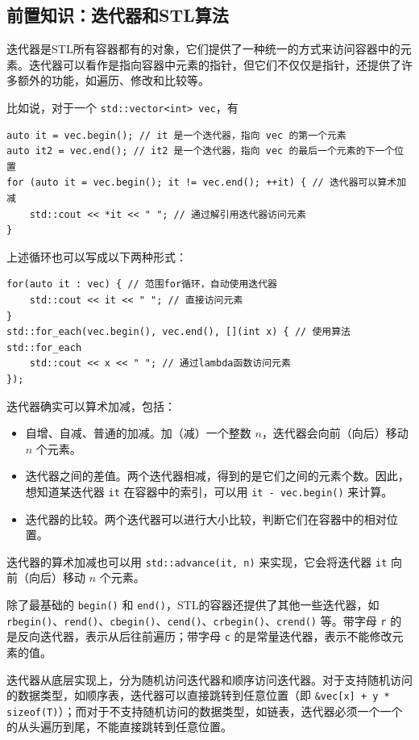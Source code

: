 \subsection{前置知识：迭代器和STL算法}

迭代器是STL所有容器都有的对象，它们提供了一种统一的方式来访问容器中的元素。迭代器可以看作是指向容器中元素的指针，但它们不仅仅是指针，还提供了许多额外的功能，如遍历、修改和比较等。

比如说，对于一个 \verb|std::vector<int> vec|，有
\begin{verbatim}
auto it = vec.begin(); // it 是一个迭代器，指向 vec 的第一个元素
auto it2 = vec.end(); // it2 是一个迭代器，指向 vec 的最后一个元素的下一个位置
for (auto it = vec.begin(); it != vec.end(); ++it) { // 迭代器可以算术加减
    std::cout << *it << " "; // 通过解引用迭代器访问元素
}
\end{verbatim}

上述循环也可以写成以下两种形式：
\begin{verbatim}
for(auto it : vec) { // 范围for循环，自动使用迭代器
    std::cout << it << " "; // 直接访问元素
}
std::for_each(vec.begin(), vec.end(), [](int x) { // 使用算法 std::for_each
    std::cout << x << " "; // 通过lambda函数访问元素
});
\end{verbatim}

迭代器确实可以算术加减，包括：
\begin{itemize}
    \item 自增、自减、普通的加减。加（减）一个整数 $n$，迭代器会向前（向后）移动 $n$ 个元素。
    \item 迭代器之间的差值。两个迭代器相减，得到的是它们之间的元素个数。因此，想知道某迭代器 \verb|it| 在容器中的索引，可以用 \verb|it - vec.begin()| 来计算。
    \item 迭代器的比较。两个迭代器可以进行大小比较，判断它们在容器中的相对位置。
\end{itemize}
迭代器的算术加减也可以用 \verb|std::advance(it, n)| 来实现，它会将迭代器 \verb|it| 向前（向后）移动 $n$ 个元素。

除了最基础的 \verb|begin()| 和 \verb|end()|，STL的容器还提供了其他一些迭代器，如 \verb|rbegin()|、\verb|rend()|、\verb|cbegin()|、\verb|cend()|、\verb|crbegin()|、\verb|crend()| 等。带字母 \verb|r| 的是反向迭代器，表示从后往前遍历；带字母 \verb|c| 的是常量迭代器，表示不能修改元素的值。

迭代器从底层实现上，分为随机访问迭代器和顺序访问迭代器。对于支持随机访问的数据类型，如顺序表，迭代器可以直接跳转到任意位置（即 \verb|&vec[x] + y * sizeof(T)|）；而对于不支持随机访问的数据类型，如链表，迭代器必须一个一个的从头遍历到尾，不能直接跳转到任意位置。

